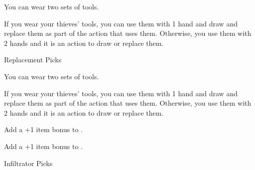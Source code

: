 


{\footnotesize
You can wear two sets of tools.

If you wear your thieves' tools, you can use them with 1 hand and draw and replace them as part of the action that uses them.
Otherwise, you use them with 2 hands and it is an action to draw or replace them.
}


Replacement Picks \ItemPrice{3sp}

\vfill




{\footnotesize
You can wear two sets of tools.

If you wear your thieves' tools, you can use them with 1 hand and draw and replace them as part of the action that uses them.
Otherwise, you use them with 2 hands and it is an action to draw or replace them.
}


Add a +1 item bonus to .


Add a +1 item bonus to .

Infiltrator Picks 

\vfill



